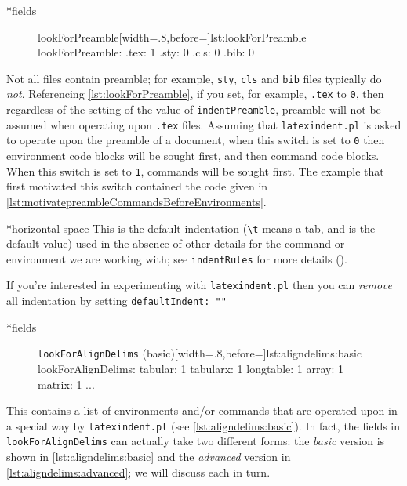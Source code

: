 \documentclass[10pt]{article}
\begin{document}
*{fields}

\begin{figure}
\begin{yaml}[firstnumber=57]{lookForPreamble}[width=.8\linewidth,before=\centering]{lst:lookForPreamble}
lookForPreamble:
    .tex: 1
    .sty: 0
    .cls: 0
    .bib: 0
\end{yaml}
\end{figure}
Not all files contain preamble; for example, \texttt{sty}, \texttt{cls} and \texttt{bib} files typically do \emph{not}. Referencing
\cref{lst:lookForPreamble}, if you set, for example, \texttt{.tex} to \texttt{0}, then regardless of the setting of the value of \texttt{indentPreamble}, preamble
will not be assumed when operating upon \texttt{.tex} files.
Assuming that \texttt{latexindent.pl} is asked to operate upon the preamble of a document,
when this switch is set to \texttt{0} then environment code blocks will be sought first, 
and then command code blocks. When this switch is set to \texttt{1}, commands 
will be sought first. The example that first motivated this switch contained the code given in \cref{lst:motivatepreambleCommandsBeforeEnvironments}.


*{horizontal space}
This is the default indentation (\lstinline!\t! means a tab, and is the default value) used in the absence of other details
for the command or environment we are working with; see \texttt{indentRules}
for more details ().

If you're interested in experimenting with \texttt{latexindent.pl} then you
can \emph{remove} all indentation by setting \texttt{defaultIndent: ""}



*{fields}
\begin{figure}
\begin{yaml}[numbers=none]{\texttt{lookForAlignDelims} (basic)}[width=.8\linewidth,before=\centering]{lst:aligndelims:basic}
lookForAlignDelims:
   tabular: 1
   tabularx: 1
   longtable: 1
   array: 1
   matrix: 1
   ...
	\end{yaml}
  \end{figure}
This contains a list of environments and/or commands that 
are operated upon in a special way by \texttt{latexindent.pl} (see \cref{lst:aligndelims:basic}).
In fact, the fields in \texttt{lookForAlignDelims} can actually
take two different forms: the \emph{basic} version is shown in \cref{lst:aligndelims:basic}
and the \emph{advanced} version in \cref{lst:aligndelims:advanced}; we will discuss each in turn.
\end{document}
